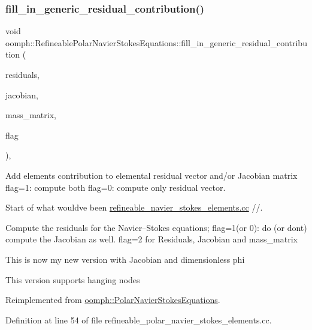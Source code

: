 \subsubsection{\texorpdfstring{fill\+\_\+in\+\_\+generic\+\_\+residual\+\_\+contribution()}{fill\_in\_generic\_residual\_contribution()}}
{\footnotesize\ttfamily void oomph\+::\+Refineable\+Polar\+Navier\+Stokes\+Equations\+::fill\+\_\+in\+\_\+generic\+\_\+residual\+\_\+contribution (\begin{DoxyParamCaption}\item[{\hyperlink{classoomph_1_1Vector}{Vector}$<$ double $>$ \&}]{residuals,  }\item[{\hyperlink{classoomph_1_1DenseMatrix}{Dense\+Matrix}$<$ double $>$ \&}]{jacobian,  }\item[{\hyperlink{classoomph_1_1DenseMatrix}{Dense\+Matrix}$<$ double $>$ \&}]{mass\+\_\+matrix,  }\item[{unsigned}]{flag }\end{DoxyParamCaption})\hspace{0.3cm}{\ttfamily [protected]}, {\ttfamily [virtual]}}



Add element\textquotesingle{}s contribution to elemental residual vector and/or Jacobian matrix flag=1\+: compute both flag=0\+: compute only residual vector. 

Start of what would\textquotesingle{}ve been \hyperlink{refineable__navier__stokes__elements_8cc}{refineable\+\_\+navier\+\_\+stokes\+\_\+elements.\+cc} //.

Compute the residuals for the Navier--Stokes equations; flag=1(or 0)\+: do (or don\textquotesingle{}t) compute the Jacobian as well. flag=2 for Residuals, Jacobian and mass\+\_\+matrix

This is now my new version with Jacobian and dimensionless phi

This version supports hanging nodes 

Reimplemented from \hyperlink{classoomph_1_1PolarNavierStokesEquations_ad0188bfed5fc5e929017226cde427839}{oomph\+::\+Polar\+Navier\+Stokes\+Equations}.



Definition at line 54 of file refineable\+\_\+polar\+\_\+navier\+\_\+stokes\+\_\+elements.\+cc.



